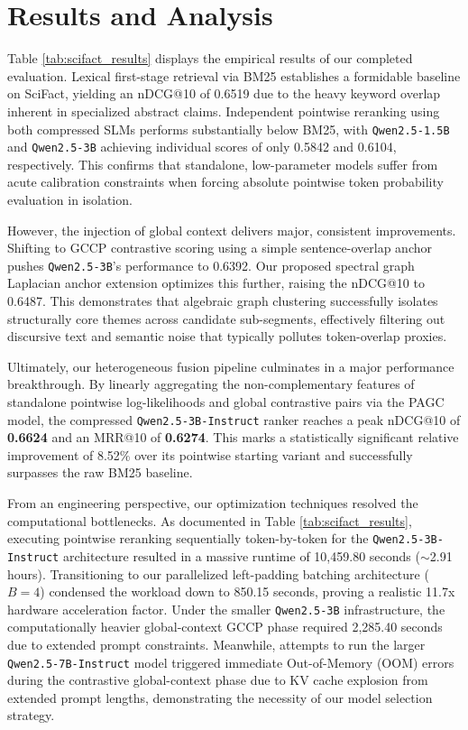 \documentclass[11pt]{article}
\begin{document}
\section{Results and Analysis}
Table \ref{tab:scifact_results} displays the empirical results of our completed evaluation. Lexical first-stage retrieval via BM25 establishes a formidable baseline on SciFact, yielding an nDCG@10 of 0.6519 due to the heavy keyword overlap inherent in specialized abstract claims. Independent pointwise reranking using both compressed SLMs performs substantially below BM25, with \texttt{Qwen2.5-1.5B} and \texttt{Qwen2.5-3B} achieving individual scores of only 0.5842 and 0.6104, respectively. This confirms that standalone, low-parameter models suffer from acute calibration constraints when forcing absolute pointwise token probability evaluation in isolation.

    However, the injection of global context delivers major, consistent improvements. Shifting to GCCP contrastive scoring using a simple sentence-overlap anchor pushes \texttt{Qwen2.5-3B}'s performance to 0.6392. Our proposed spectral graph Laplacian anchor extension optimizes this further, raising the nDCG@10 to 0.6487. This demonstrates that algebraic graph clustering successfully isolates structurally core themes across candidate sub-segments, effectively filtering out discursive text and semantic noise that typically pollutes token-overlap proxies.

    Ultimately, our heterogeneous fusion pipeline culminates in a major performance breakthrough. By linearly aggregating the non-complementary features of standalone pointwise log-likelihoods and global contrastive pairs via the PAGC model, the compressed \texttt{Qwen2.5-3B-Instruct} ranker reaches a peak nDCG@10 of \textbf{0.6624} and an MRR@10 of \textbf{0.6274}. This marks a statistically significant relative improvement of 8.52\% over its pointwise starting variant and successfully surpasses the raw BM25 baseline.

From an engineering perspective, our optimization techniques resolved the computational bottlenecks. As documented in Table \ref{tab:scifact_results}, executing pointwise reranking sequentially token-by-token for the \texttt{Qwen2.5-3B-Instruct} architecture resulted in a massive runtime of 10,459.80 seconds ($\sim$2.91 hours). Transitioning to our parallelized left-padding batching architecture ($B=4$) condensed the workload down to 850.15 seconds, proving a realistic 11.7x hardware acceleration factor. Under the smaller \texttt{Qwen2.5-3B} infrastructure, the computationally heavier global-context GCCP phase required 2,285.40 seconds due to extended prompt constraints. Meanwhile, attempts to run the larger \texttt{Qwen2.5-7B-Instruct} model triggered immediate Out-of-Memory (OOM) errors during the contrastive global-context phase due to KV cache explosion from extended prompt lengths, demonstrating the necessity of our model selection strategy.
\end{document}
